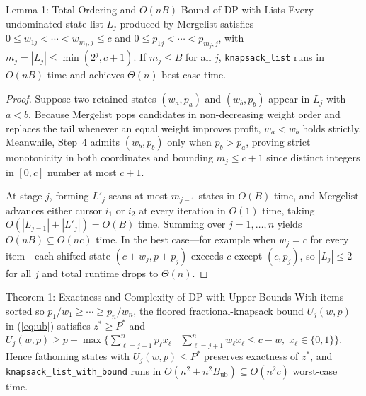\documentclass[10pt, a4paper]{article}
\newcommand{\code}[1]{\texttt{\color{primary!90!black}#1}}
\newcommand{\id}[1]{\ensuremath{\mathrm{#1}}}
\begin{document}
\begin{lemmabx}{Lemma 1: Total Ordering and $O(nB)$ Bound of \textsf{DP-with-Lists} \cite{kellerer2004knapsack}}
Every undominated state list $L_j$ produced by \id{Mergelist} satisfies $0 \le w_{1j} < \cdots < w_{m_j,j} \le c$ and $0 \le p_{1j} < \cdots < p_{m_j,j}$, with $m_j = |L_j| \le \min(2^j, c+1)$. If $m_j \le B$ for all $j$, \code{knapsack\_list} runs in $O(nB)$ time and achieves $\Theta(n)$ best-case time.
\end{lemmabx}

\begin{proof}
Suppose two retained states $(w_a, p_a)$ and $(w_b, p_b)$ appear in $L_j$ with $a < b$. Because \id{Mergelist} pops candidates in non-decreasing weight order and replaces the tail whenever an equal weight improves profit, $w_a < w_b$ holds strictly. Meanwhile, Step~4 admits $(w_b, p_b)$ only when $p_b > p_a$, proving strict monotonicity in both coordinates and bounding $m_j \le c + 1$ since distinct integers in $[0, c]$ number at most $c + 1$.

At stage $j$, forming $L'_j$ scans at most $m_{j-1}$ states in $O(B)$ time, and \id{Mergelist} advances either cursor $i_1$ or $i_2$ at every iteration in $O(1)$ time, taking $O(|L_{j-1}| + |L'_j|) = O(B)$ time. Summing over $j = 1, \ldots, n$ yields $O(nB) \subseteq O(nc)$ time. In the best case---for example when $w_j = c$ for every item---each shifted state $(c + w_j, p + p_j)$ exceeds $c$ except $(c, p_j)$, so $|L_j| \le 2$ for all $j$ and total runtime drops to $\Theta(n)$.
\end{proof}

\begin{theorembx}{Theorem 1: Exactness and Complexity of \textsf{DP-with-Upper-Bounds} \cite{kellerer2004knapsack}}
With items sorted so $p_1/w_1 \ge \cdots \ge p_n/w_n$, the floored fractional-knapsack bound $U_j(w, p)$ in (\ref{eq:ub}) satisfies $z^* \ge P^*$ and $U_j(w, p) \ge p + \max\{\sum_{\ell=j+1}^n p_\ell x_\ell \mid \sum_{\ell=j+1}^n w_\ell x_\ell \le c - w,\; x_\ell \in \{0,1\}\}$. Hence fathoming states with $U_j(w, p) \le P^*$ preserves exactness of $z^*$, and \code{knapsack\_list\_with\_bound} runs in $O(n^2 + n^2 B_{\text{ub}}) \subseteq O(n^2 c)$ worst-case time.
\end{theorembx}
\end{document}
